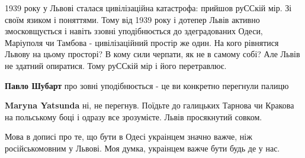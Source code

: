 \begin{itemize}
 

1939 року у Львові сталася цивілізаційна катастрофа: прийшов руССкій мір. Зі
своїм язиком і поняттями. Тому від 1939 року і дотепер Львів активно
змосковщується і навіть ззовні уподібнюється до здеградованих Одеси, Маріуполя
чи Тамбова - цивілізаційний простір же один. На кого рівнятися Львову на цьому
просторі? В кому сили черпати, як не в самому собі? Але Львів не здатний
опиратися. Тому руССкій мір і його перетравлює.

\begin{itemize}
 
\textbf{Павло Шубарт} про зовні уподібнюється - це ви конкретно перегнули палицю

 
\textbf{Maryna Yatsunda} ні, не перегнув. Поїдьте до галицьких Тарнова чи Кракова на польському боці і одразу все зрозумієте. Львів просякнутий совком.
\end{itemize}

 

Мова в дописі про те, що бути в Одесі украінцем значно важче, ніж
російськомовним у Львові. Моя думка, украінцем важче бути будь де у нас.

\begin{itemize}
 

\end{itemize}
\end{itemize}
